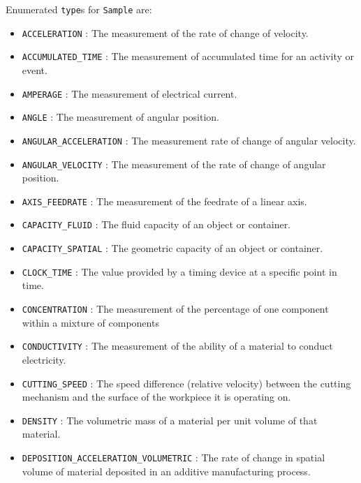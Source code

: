  Enumerated \texttt{type}s for \texttt{Sample} are:
\begin{itemize}

\item \texttt{ACCELERATION} : The measurement of the rate of change of velocity. 

\item \texttt{ACCUMULATED_TIME} : The measurement of accumulated time for an activity or event. 

\item \texttt{AMPERAGE} : The measurement of electrical current. 

\item \texttt{ANGLE} : The measurement of angular position. 

\item \texttt{ANGULAR_ACCELERATION} : The measurement rate of change of angular velocity. 

\item \texttt{ANGULAR_VELOCITY} : The measurement of the rate of change of angular position. 

\item \texttt{AXIS_FEEDRATE} : The measurement of the feedrate of a linear axis. 

\item \texttt{CAPACITY_FLUID} : The fluid capacity of an object or container. 

\item \texttt{CAPACITY_SPATIAL} : The geometric capacity of an object or container. 

\item \texttt{CLOCK_TIME} : The value provided by a timing device at a specific point in time. 

\item \texttt{CONCENTRATION} : The measurement of the percentage of one component within a mixture of components 

\item \texttt{CONDUCTIVITY} : The measurement of the ability of a material to conduct electricity. 

\item \texttt{CUTTING_SPEED} : The speed difference (relative velocity) between the cutting mechanism and the surface of the workpiece it is operating on. 

\item \texttt{DENSITY} : The volumetric mass of a material per unit volume of that material. 

\item \texttt{DEPOSITION_ACCELERATION_VOLUMETRIC} : The rate of change in spatial volume of material deposited in an additive manufacturing process. 


\end{itemize}

